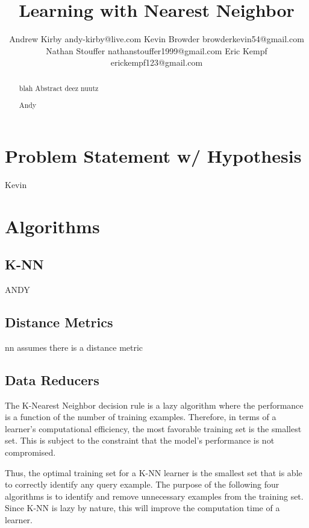 \documentclass[twoside,11pt]{article}
\begin{document}
\title{Learning with Nearest Neighbor}

\author{\name Andrew Kirby \email andy-kirby@live.com \AND
		\name Kevin Browder \email browderkevin54@gmail.com \AND
		\name Nathan Stouffer \email nathanstouffer1999@gmail.com \AND
		\name Eric Kempf \email erickempf123@gmail.com }

\maketitle

\begin{abstract}
	blah Abstract deez nuutz
	
	Andy 
	
\end{abstract}

\section{Problem Statement w/ Hypothesis}

Kevin

\section{Algorithms}

\subsection{K-NN}

ANDY

\subsection{Distance Metrics}

nn assumes there is a distance metric

\subsection{Data Reducers}
The K-Nearest Neighbor decision rule is a lazy algorithm where the performance is a function of the number of training examples. Therefore, in terms of a learner's computational efficiency, the most favorable training set is the smallest set.
This is subject to the constraint that the model's performance is not compromised.

Thus, the optimal training set for a K-NN learner is the smallest set that is able to correctly identify any query example.
The purpose of the following four algorithms is to identify and remove unnecessary examples from the training set. Since K-NN is lazy by nature, this will improve the computation time of a learner.
\end{document}
